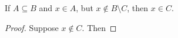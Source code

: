 
\begin{theorem}
  If $A \subseteq B$ and $x \in A$, but $x \notin B\setminus C$, then $x
  \in C$. 
\end{theorem}

\begin{proof}
  Suppose $x \notin C$. Then
\end{proof}



\begin{align*}
\end{align*}
